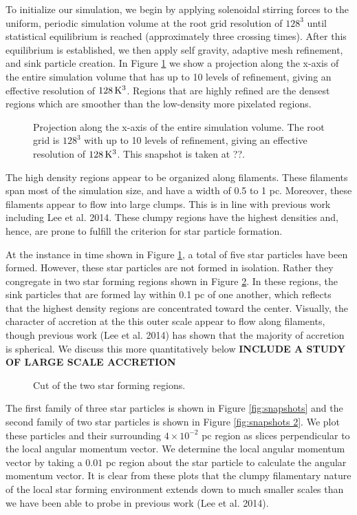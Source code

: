 \documentclass{emulateapj}
\begin{document}
To initialize our simulation, we begin by applying solenoidal stirring forces to the uniform, periodic simulation volume at the root grid resolution of $128^3$ until statistical equilibrium is reached (approximately three crossing times).  After this equilibrium is established, we then apply self gravity, adaptive mesh refinement, and sink particle creation.  In Figure \ref{fig:entire projection} we show a projection along the x-axis of the entire simulation volume that has up to 10 levels of refinement, giving an effective resolution of $128\,{\rm K}^3$. Regions that are highly refined are the densest regions which are smoother than the low-density more pixelated regions.
\begin{figure}
\caption{Projection along the x-axis of the entire simulation volume. The root grid is $128^3$ with up to 10 levels of refinement, giving an effective resolution of $128\,{\rm K}^3$. This snapshot is taken at ??. \label{fig:entire projection}}
\end{figure}

The high density regions appear to be organized along filaments.  These filaments span most of the simulation size, and have a width of 0.5 to 1 pc.  Moreover, these filaments appear to flow into large clumps.  This is in line with previous work including Lee et al. 2014. These clumpy regions have the highest densities and, hence, are prone to fulfill the criterion for star particle formation.  

At the instance in time shown in Figure \ref{fig:entire projection}, a total of five star particles have been formed.  However, these star particles are not formed in isolation.  Rather they congregate in two star forming regions shown in Figure \ref{fig:star forming regions}.  In these regions, the sink particles that are formed lay within 0.1 pc of one another, which reflects that the highest density regions are concentrated toward the center.  Visually, the character of accretion at the this outer scale appear to flow along filaments, though previous work (Lee et al. 2014) has shown that the majority of accretion is spherical.  We discuss this more quantitatively below {\bf INCLUDE A STUDY OF LARGE SCALE ACCRETION}


\begin{figure}
\caption{Cut of the two star forming regions.\label{fig:star forming regions}}
\end{figure}

The first family of three star particles is shown in Figure \ref{fig:snapshots} and the second family of two star particles is shown in Figure \ref{fig:snapshots 2}.  We plot these particles and their surrounding $4\times 10^{-2}$ pc region as slices perpendicular to the local angular momentum vector.  We determine the local angular momentum vector by taking a $0.01$ pc region about the star particle to calculate the angular momentum vector.  It is clear from these plots that the clumpy filamentary nature of the local star forming environment extends down to much smaller scales than we have been able to probe in previous work (Lee et al. 2014).  
\end{document}
